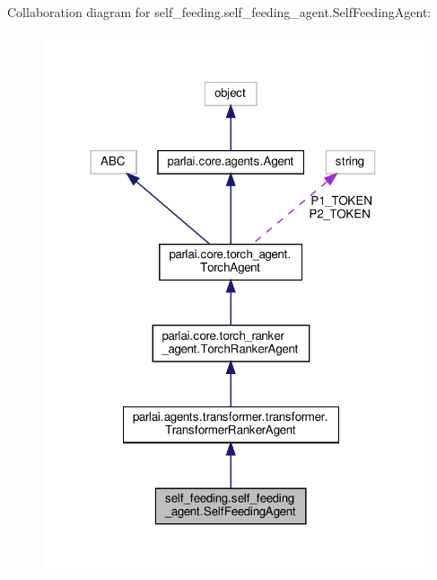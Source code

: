 Collaboration diagram for self\+\_\+feeding.\+self\+\_\+feeding\+\_\+agent.\+Self\+Feeding\+Agent\+:
\nopagebreak
\begin{figure}[H]
\begin{center}
\leavevmode
\includegraphics[width=318pt]{classself__feeding_1_1self__feeding__agent_1_1SelfFeedingAgent__coll__graph}
\end{center}
\end{figure}
